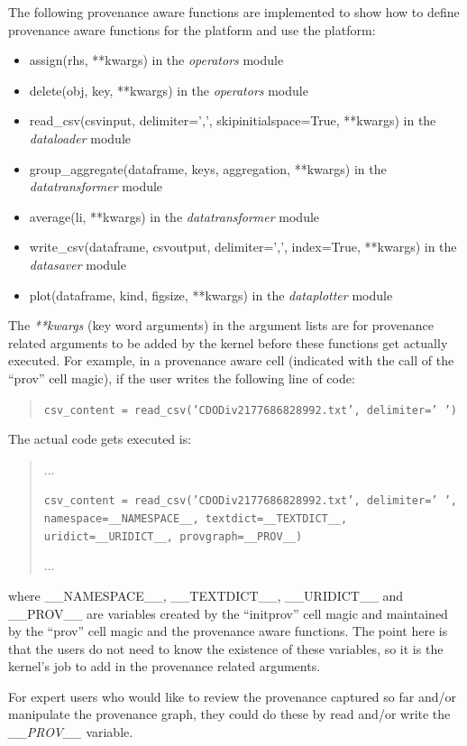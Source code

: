 The following provenance aware functions are implemented to show how to define provenance aware functions for the platform and use the platform:
\begin{itemize}
	\item assign(rhs, **kwargs) in the \emph{operators} module
	\item delete(obj, key, **kwargs) in the \emph{operators} module
	\item read\_csv(csvinput, delimiter=',', skipinitialspace=True, **kwargs) in the \emph{dataloader} module
	\item group\_aggregate(dataframe, keys, aggregation, **kwargs) in the \emph{datatransformer} module
	\item average(li, **kwargs) in the \emph{datatransformer} module
	\item write\_csv(dataframe, csvoutput, delimiter=',', index=True, **kwargs) in the \emph{datasaver} module
	\item plot(dataframe, kind, figsize, **kwargs) in the \emph{dataplotter} module
\end{itemize}
The \emph{**kwargs} (key word arguments) in the argument lists are for provenance related arguments to be added by the kernel before these functions get actually executed. For example, in a provenance aware cell (indicated with the call of the ``prov'' cell magic), if the user writes the following line of code:
\begin{quotation}
\noindent\texttt{csv\_content = read\_csv('CDODiv2177686828992.txt', delimiter=' ')}
\end{quotation}
The actual code gets executed is:
\begin{quotation}
	\noindent...
	
	\noindent\texttt{csv\_content = read\_csv('CDODiv2177686828992.txt', delimiter=' ', namespace=\_\_NAMESPACE\_\_, textdict=\_\_TEXTDICT\_\_, uridict=\_\_URIDICT\_\_, provgraph=\_\_PROV\_\_)}
	
	\noindent...
\end{quotation}
where \_\_NAMESPACE\_\_, \_\_TEXTDICT\_\_, \_\_URIDICT\_\_ and \_\_PROV\_\_ are variables created by the ``initprov'' cell magic and maintained by the ``prov'' cell magic and the provenance aware functions. The point here is that the users do not need to know the existence of these variables, so it is the kernel's job to add in the provenance related arguments.

For expert users who would like to review the provenance captured so far and/or manipulate the provenance graph, they could do these by read and/or write the \emph{\_\_PROV\_\_} variable.

